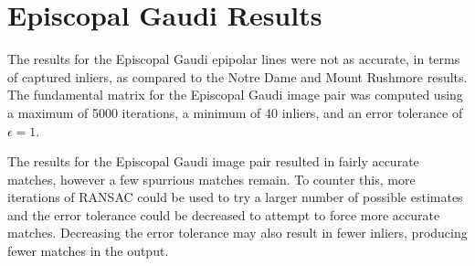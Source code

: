 \documentclass{article}
\begin{document}
		\section{Episcopal Gaudi Results}



	The results for the Episcopal Gaudi epipolar lines were not as accurate, in terms of captured inliers, as compared to the Notre Dame and Mount Rushmore results. The fundamental matrix for the Episcopal Gaudi image pair was computed using a maximum of 5000 iterations, a minimum of 40 inliers, and an error tolerance of $\epsilon = 1$.

The results for the Episcopal Gaudi image pair resulted in fairly accurate matches, however a few spurrious matches remain. To counter this, more iterations of RANSAC could be used to try a larger number of possible estimates and the error tolerance could be decreased to attempt to force more accurate matches. Decreasing the error tolerance may also result in fewer inliers, producing fewer matches in the output. 
\end{document}
